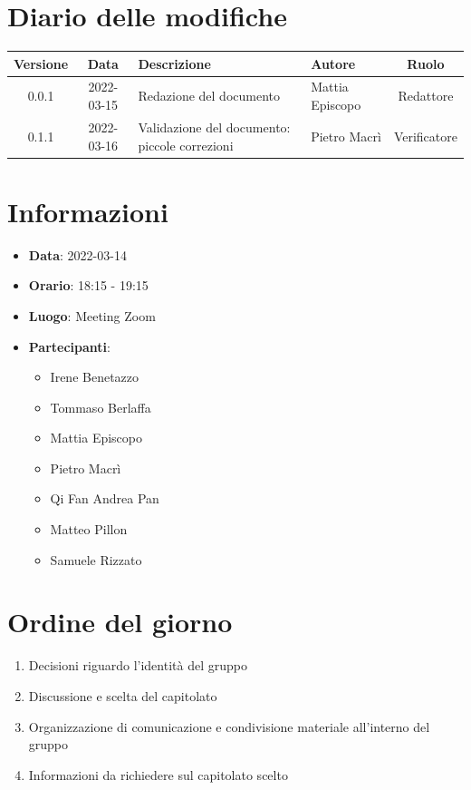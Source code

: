 \documentclass[12pt, a4paper,table]{article}
\begin{document}
	\section*{Diario delle modifiche}
	\begin{center}
	\begin{tabular}{ |c|c|m{9em}|m{5em}|c| }
	\hline
	\textbf{Versione} & \textbf{Data} & \textbf{Descrizione} &  \textbf{Autore} &  \textbf{Ruolo} \\
	\hline
	0.0.1 & 2022-03-15 & Redazione del documento & Mattia Episcopo & Redattore\\
	\hline
    0.1.1 & 2022-03-16 & Validazione del documento: piccole correzioni & Pietro Macrì & Verificatore\\
	\hline
	\end{tabular}
	\end{center}
	\newpage
	\tableofcontents
	\newpage
	\section{Informazioni}
	\begin{itemize}
		\item \textbf{Data}: 2022-03-14
		\item \textbf{Orario}: 18:15 - 19:15
		\item \textbf{Luogo}: Meeting Zoom
		\item \textbf{Partecipanti}:
		\begin{itemize}
			\item Irene Benetazzo
			\item Tommaso Berlaffa
			\item Mattia Episcopo
			\item Pietro Macrì
			\item Qi Fan Andrea Pan
			\item Matteo Pillon
			\item Samuele Rizzato
		\end{itemize}
	\end{itemize}
	\section{Ordine del giorno}
	\begin{enumerate}
		\item Decisioni riguardo l'identità del gruppo
		\item Discussione e scelta del capitolato
		\item Organizzazione di comunicazione e condivisione materiale all'interno del gruppo
		\item Informazioni da richiedere sul capitolato scelto
	\end{enumerate}
	\newpage
\end{document}
